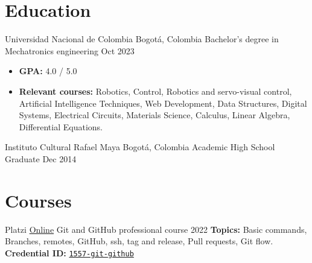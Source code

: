 \section*{Education}
\begin{entrylist}
    \entry
    {Universidad Nacional de Colombia}
    {Bogotá, Colombia}
    {Bachelor’s degree in Mechatronics engineering }
    {Oct 2023}
    {\begin{itemize}
            \item \textbf{GPA:} 4.0 / 5.0
            \item \textbf{Relevant courses:} Robotics, Control, Robotics and servo-visual control, Artificial Intelligence Techniques, Web Development, Data Structures, Digital Systems, Electrical Circuits, Materials Science, Calculus, Linear Algebra, Differential Equations.
        \end{itemize}
    }

    \entry
    {Instituto Cultural Rafael Maya}
    {Bogotá, Colombia}
    {Academic High School Graduate}
    {Dec 2014}
    {}
\end{entrylist}

\section*{Courses}
\begin{entrylist}
    \entry
    {Platzi}
    {\href{https://platzi.com/cursos/git-github/}{Online}}
    {Git and GitHub professional course}
    {2022}
    {\textbf{Topics:} Basic commands, Branches, remotes, GitHub, ssh, tag and release, Pull requests, Git flow. \\
        \textbf{Credential ID:} \href{https://platzi.com/p/cychitivav/curso/1557-git-github/diploma/detalle/}{\texttt{1557-git-github}}
    }
\end{entrylist}